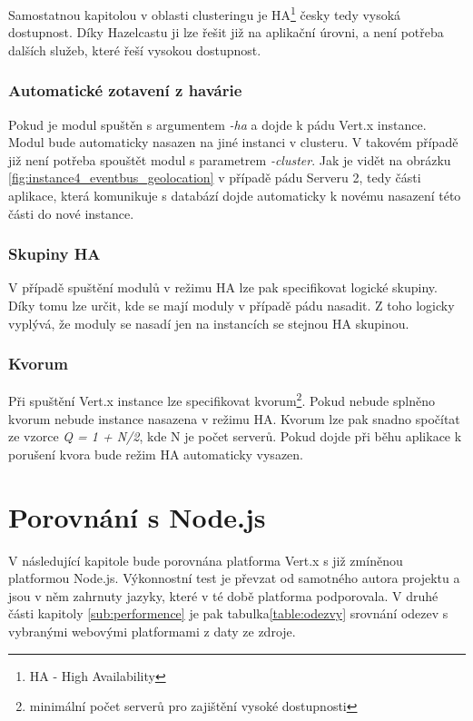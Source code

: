 Samostatnou kapitolou v oblasti clusteringu je HA\footnote{HA - High Availability} česky tedy vysoká dostupnost. Díky Hazelcastu ji lze řešit již na aplikační úrovni, a není potřeba  dalších služeb, které řeší vysokou dostupnost.

\subsubsection{Automatické zotavení z havárie}

Pokud je modul spuštěn s argumentem \emph{-ha} a dojde k pádu Vert.x instance. Modul bude automaticky nasazen na jiné instanci v clusteru. V takovém případě již není potřeba spouštět modul s parametrem \emph{-cluster}. Jak je vidět na obrázku \ref{fig:instance4_eventbus_geolocation} v případě pádu Serveru 2, tedy části aplikace, která komunikuje s databází dojde automaticky k novému nasazení této části do nové instance.

\subsubsection{Skupiny HA}

V případě spuštění modulů v režimu HA lze pak specifikovat logické skupiny. Díky tomu lze určit, kde se mají moduly v případě pádu nasadit. Z toho logicky vyplývá, že moduly se nasadí jen na instancích se stejnou HA skupinou.

\subsubsection{Kvorum}

Při spuštění Vert.x instance lze specifikovat kvorum\footnote{minimální počet serverů pro zajištění vysoké dostupnosti}. Pokud nebude splněno kvorum nebude instance nasazena v režimu HA. Kvorum lze pak snadno spočítat ze vzorce \emph{Q = 1 + N/2}, kde N je počet serverů. Pokud dojde při běhu aplikace k porušení kvora bude režim HA automaticky vysazen.

\section{Porovnání s Node.js}

V následující kapitole bude porovnána platforma Vert.x s již zmíněnou platformou Node.js. Výkonnostní test\cite{benchmarkTim} je převzat od samotného autora projektu a jsou v něm zahrnuty jazyky, které v té době platforma podporovala. V druhé části kapitoly \ref{sub:performence} je pak tabulka\ref{table:odezvy} srovnání odezev s vybranými webovými platformami z daty ze zdroje\cite{benchmark}.

